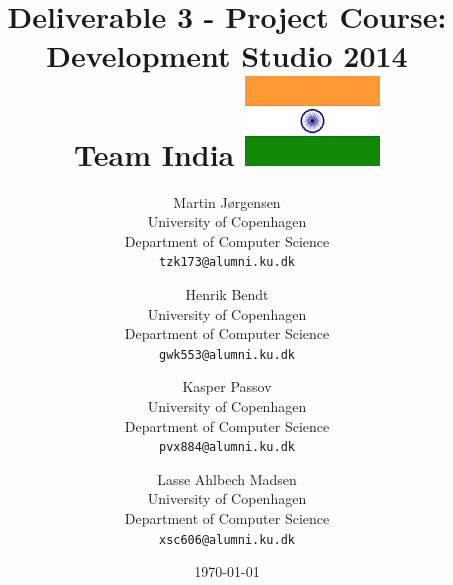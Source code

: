 \documentclass[a4paper,11pt]{article}
\title{Deliverable 3 - Project Course: Development Studio 2014 \\ Team India \includegraphics[width=.04\textwidth]{india.png}}
\author
{
    Martin Jørgensen \\
    University of Copenhagen \\
    Department of Computer Science \\
    {\tt tzk173@alumni.ku.dk}
    \and
    Henrik Bendt \\
    University of Copenhagen \\
    Department of Computer Science \\
    {\tt gwk553@alumni.ku.dk}
    \and
    Kasper Passov \\
    University of Copenhagen \\
    Department of Computer Science \\
    {\tt pvx884@alumni.ku.dk}
    \and
    Lasse Ahlbech Madsen \\
    University of Copenhagen \\
    Department of Computer Science \\
    {\tt xsc606@alumni.ku.dk}
}
\date{\today}
\begin{document}
\maketitle

\tableofcontents
\pagebreak





\end{document}
